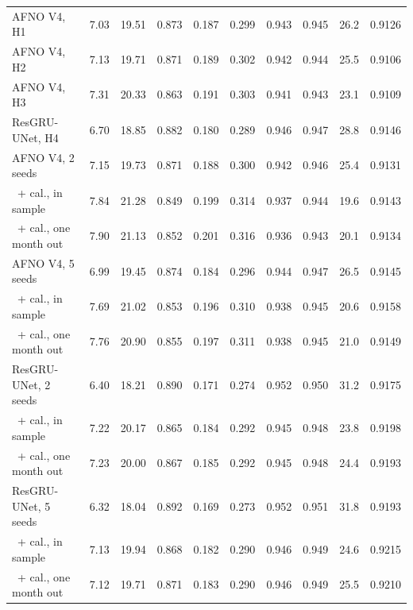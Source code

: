 \documentclass[journal]{IEEEtran}
\begin{document}
\begin{table}[tp]
\begin{tabular}{@{}lrrrrrrrrr@{}}
\midrule
AFNO V4, H1 & 7.03 & 19.51 & 0.873 & 0.187 & 0.299 & 0.943 & 0.945 & 26.2 & 0.9126 \\
AFNO V4, H2 & 7.13 & 19.71 & 0.871 & 0.189 & 0.302 & 0.942 & 0.944 & 25.5 & 0.9106 \\
AFNO V4, H3 & 7.31 & 20.33 & 0.863 & 0.191 & 0.303 & 0.941 & 0.943 & 23.1 & 0.9109 \\
ResGRU-UNet, H4 & 6.70 & 18.85 & 0.882 & 0.180 & 0.289 & 0.946 & 0.947 & 28.8 & 0.9146 \\
\midrule
AFNO V4, 2 seeds & 7.15 & 19.73 & 0.871 & 0.188 & 0.300 & 0.942 & 0.946 & 25.4 & 0.9131 \\
\ + cal., in sample & 7.84 & 21.28 & 0.849 & 0.199 & 0.314 & 0.937 & 0.944 & 19.6 & 0.9143 \\
\ + cal., one month out & 7.90 & 21.13 & 0.852 & 0.201 & 0.316 & 0.936 & 0.943 & 20.1 & 0.9134 \\
AFNO V4, 5 seeds & 6.99 & 19.45 & 0.874 & 0.184 & 0.296 & 0.944 & 0.947 & 26.5 & 0.9145 \\
\ + cal., in sample & 7.69 & 21.02 & 0.853 & 0.196 & 0.310 & 0.938 & 0.945 & 20.6 & 0.9158 \\
\ + cal., one month out & 7.76 & 20.90 & 0.855 & 0.197 & 0.311 & 0.938 & 0.945 & 21.0 & 0.9149 \\
\midrule
ResGRU-UNet, 2 seeds & 6.40 & 18.21 & 0.890 & 0.171 & 0.274 & 0.952 & 0.950 & 31.2 & 0.9175 \\
\ + cal., in sample & 7.22 & 20.17 & 0.865 & 0.184 & 0.292 & 0.945 & 0.948 & 23.8 & 0.9198 \\
\ + cal., one month out & 7.23 & 20.00 & 0.867 & 0.185 & 0.292 & 0.945 & 0.948 & 24.4 & 0.9193 \\
ResGRU-UNet, 5 seeds & 6.32 & 18.04 & 0.892 & 0.169 & 0.273 & 0.952 & 0.951 & 31.8 & 0.9193 \\
\ + cal., in sample & 7.13 & 19.94 & 0.868 & 0.182 & 0.290 & 0.946 & 0.949 & 24.6 & 0.9215 \\
\ + cal., one month out & 7.12 & 19.71 & 0.871 & 0.183 & 0.290 & 0.946 & 0.949 & 25.5 & 0.9210 \\
\bottomrule
\end{tabular}
\end{table}
\end{document}
